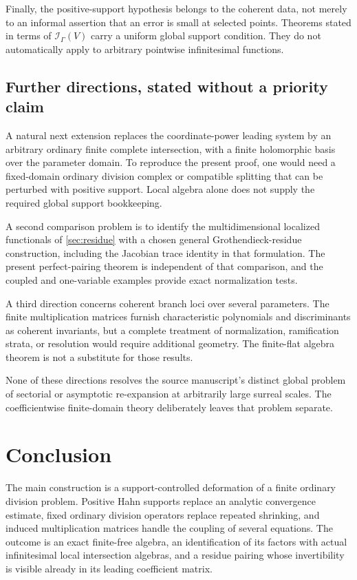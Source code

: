 \documentclass[11pt,oneside]{article}
\numberwithin{equation}{section}
\theoremstyle{definition}
\theoremstyle{remark}\newtheorem{remark}[theorem]{Remark}
\newcommand{\Ip}{\mathcal I_{\Gamma}}
\begin{document}
Finally, the positive-support hypothesis belongs to the coherent data, not merely to an informal assertion that an error is small at selected points. Theorems stated in terms of \(\Ip(V)\) carry a uniform global support condition. They do not automatically apply to arbitrary pointwise infinitesimal functions.

\subsection{Further directions, stated without a priority claim}
A natural next extension replaces the coordinate-power leading system by an arbitrary ordinary finite complete intersection, with a finite holomorphic basis over the parameter domain. To reproduce the present proof, one would need a fixed-domain ordinary division complex or compatible splitting that can be perturbed with positive support. Local algebra alone does not supply the required global support bookkeeping.

A second comparison problem is to identify the multidimensional localized functionals of \cref{sec:residue} with a chosen general Grothendieck-residue construction, including the Jacobian trace identity in that formulation. The present perfect-pairing theorem is independent of that comparison, and the coupled and one-variable examples provide exact normalization tests.

A third direction concerns coherent branch loci over several parameters. The finite multiplication matrices furnish characteristic polynomials and discriminants as coherent invariants, but a complete treatment of normalization, ramification strata, or resolution would require additional geometry. The finite-flat algebra theorem is not a substitute for those results.

None of these directions resolves the source manuscript's distinct global problem of sectorial or asymptotic re-expansion at arbitrarily large surreal scales. The coefficientwise finite-domain theory deliberately leaves that problem separate.

\section{Conclusion}
The main construction is a support-controlled deformation of a finite ordinary division problem. Positive Hahn supports replace an analytic convergence estimate, fixed ordinary division operators replace repeated shrinking, and induced multiplication matrices handle the coupling of several equations. The outcome is an exact finite-free algebra, an identification of its factors with actual infinitesimal local intersection algebras, and a residue pairing whose invertibility is visible already in its leading coefficient matrix.
\end{document}
